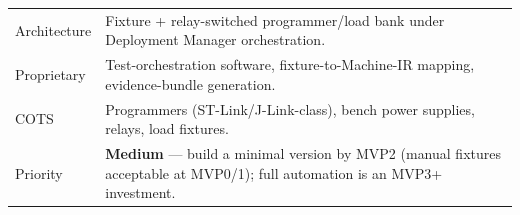 \begin{longtable}{@{}p{2.1cm} p{12.6cm}@{}}
Architecture & Fixture + relay-switched programmer/load bank under Deployment Manager orchestration. \\
Proprietary & Test-orchestration software, fixture-to-Machine-IR mapping, evidence-bundle generation. \\
COTS & Programmers (ST-Link/J-Link-class), bench power supplies, relays, load fixtures. \\
Priority & \textbf{Medium} --- build a minimal version by MVP2 (manual fixtures acceptable at MVP0/1); full automation is an MVP3+ investment. \\
\bottomrule
\end{longtable}
\normalsize
